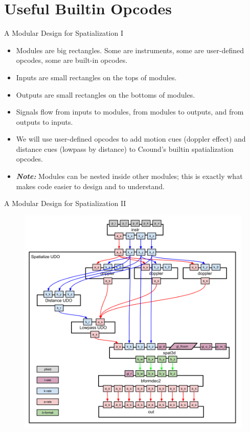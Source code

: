 \documentclass{beamer}
\begin{document}
    \section{Useful Builtin Opcodes}
    
    \begin{frame}{A Modular Design for Spatialization I}
        \begin{itemize}
            \item Modules are big rectangles. Some are instruments, some are user-defined opcodes, some are built-in opcodes.
            \item Inputs are small rectangles on the tops of modules.
            \item Outputs are small rectangles on the bottoms of modules.
            \item Signals flow from inputs to modules, from modules to outputs, and from outputs to inputs.
            \item We will use user-defined opcodes to add motion cues (doppler effect) and distance cues (lowpass by distance) to Csound's builtin spatialization opcodes.
            \item \textit{\textbf{Note:}} Modules can be nested inside other modules; this is exactly what makes code easier to design and to understand.
        \end{itemize}
    \end{frame}

    \begin{frame}{A Modular Design for Spatialization II}
        \begin{figure}
            \centerline{\includegraphics[height = 0.66\textwidth]{Spatialization}}
        \end{figure}        
    \end{frame}
    
\end{document}
